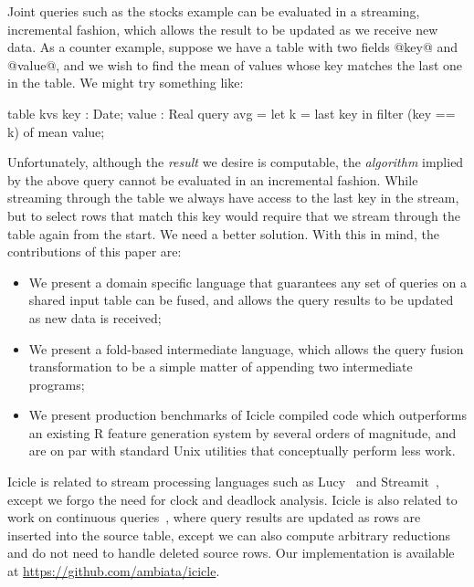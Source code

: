 Joint queries such as the stocks example can be evaluated in a streaming, incremental fashion, which allows the result to be updated as we receive new data. As a counter example, suppose we have a table with two fields @key@ and @value@, and we wish to find the mean of values whose key matches the last one in the table. We might try something like:
\begin{code}
  table kvs { key : Date; value : Real }
  query avg = let k = last key
              in  filter (key == k) of mean value;
\end{code}
Unfortunately, although the \emph{result} we desire is computable, the \emph{algorithm} implied by the above query cannot be evaluated in an incremental fashion. While streaming through the table we always have access to the last key in the stream, but to select rows that match this key would require that we stream through the table again from the start. We need a better solution. With this in mind, the contributions of this paper are:
\begin{itemize}
\item
We present a domain specific language that guarantees any set of queries on a shared input table can be fused, and allows the query results to be updated as new data is received;

\item
We present a fold-based intermediate language, which allows the query fusion transformation to be a simple matter of appending two intermediate programs;

\item
We present production benchmarks of Icicle compiled code which outperforms an existing R feature generation system by several orders of magnitude, and are on par with standard Unix utilities that conceptually perform less work.
\end{itemize}

Icicle is related to stream processing languages such as Lucy~\cite{mandel2010lucy} and Streamit~\cite{thies2002streamit}, except we forgo the need for clock and deadlock analysis. Icicle is also related to work on continuous queries~\cite{arasu2003cql}, where query results are updated as rows are inserted into the source table, except we can also compute arbitrary reductions and do not need to handle deleted source rows. Our implementation is available at \url{https://github.com/ambiata/icicle}.

